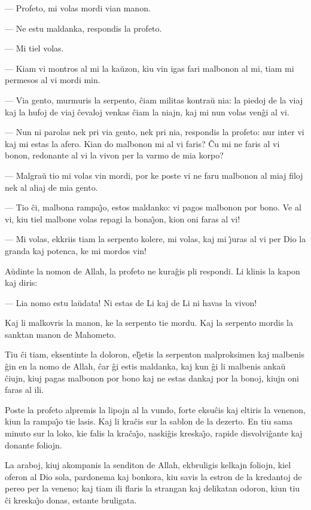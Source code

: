 {{ --- Profeto, mi volas mordi vian manon.

 --- Ne estu maldanka, respondis la profeto.

 --- Mi tiel volas.

 --- Kiam vi montros al mi la ka\u uzon, kiu vin igas fari malbonon al
mi, tiam mi permesos al vi mordi min.

 --- Via gento, murmuris la serpento, \^ciam militas kontra\u u nia: la
piedoj de la viaj kaj la hufoj de viaj \^cevaloj venkas \^ciam la
niajn, kaj mi nun volas ven\^gi al vi.

 --- Nun ni parolas nek pri via gento, nek pri nia, respondis la
profeto: nur inter vi kaj mi estas la afero. Kian do malbonon mi al
vi faris? \^Cu mi ne faris al vi bonon, redonante al vi la vivon per
la varmo de mia korpo?

 --- Malgra\u u tio mi volas vin mordi, por ke poste vi ne faru malbonon
al miaj filoj nek al aliaj de mia gento.

 --- Tio \^ci, malbona rampa\^{\j}o, estos maldanko: vi pagos malbonon por
bono. Ve al vi, kiu tiel malbone volas repagi la bona\^{\j}on, kion
oni faras al vi!

 --- Mi volas, ekkriis tiam la serpento kolere, mi volas, kaj mi \^{\j}uras
al vi per Dio la granda kaj potenca, ke mi mordos vin!

   A\u udinte la nomon de Allah, la profeto ne kura\^gis pli respondi. Li
klinis la kapon kaj diris:

 --- Lia nomo estu la\u udata! Ni estas de Li kaj de Li ni havas la
vivon!

   Kaj li malkovris la manon, ke la serpento tie mordu. Kaj la serpento
mordis la sanktan manon de Mahometo.

   Tiu \^ci tiam, eksentinte la doloron, el\^{\j}etis la serpenton
malproksimen kaj malbenis \^gin en la nomo de Allah, \^car \^gi
estis maldanka, kaj kun \^gi li malbenis anka\u u \^ciujn, kiuj
pagas malbonon por bono kaj ne estas dankaj por la bonoj, kiujn oni
faras al ili.

   Poste la profeto alpremis la lipojn al la vundo, forte eksu\^cis kaj
eltiris la venenon, kiun la rampa\^{\j}o tie lasis. Kaj li kra\^cis
sur la sablon de la dezerto. En tiu sama minuto sur la loko, kie
falis la kra\^ca\^{\j}o, naski\^gis kreska\^{\j}o, rapide
disvolvi\^gante kaj donante foliojn.

   La araboj, kiuj akompanis la senditon de Allah, ekbruligis kelkajn
foliojn, kiel oferon al Dio sola, pardonema kaj bonkora, kiu savis
la estron de la kredantoj de pereo per la veneno; kaj tiam ili
flaris la strangan kaj delikatan odoron, kiun tiu \^ci kreska\^{\j}o
donas, estante bruligata.

}}
